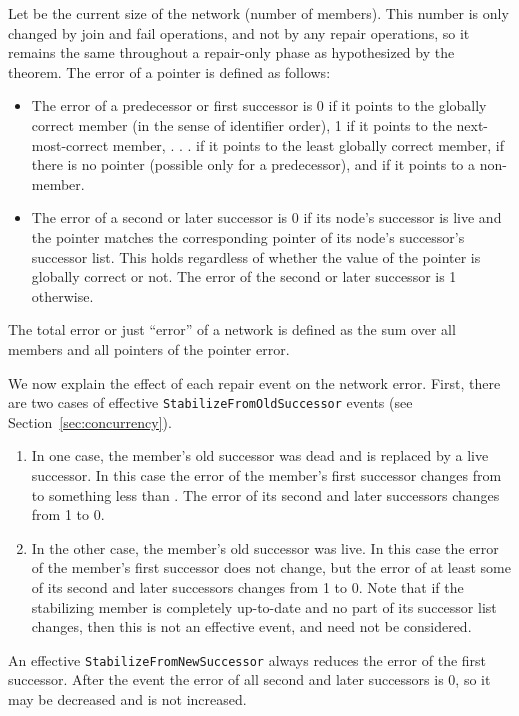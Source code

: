\documentclass[conference]{IEEEtran}
\begin{document}
Let  be the current size of the network (number of members).
This number is only changed by join and fail operations, and not by
any repair operations, so it remains the same throughout a repair-only
phase as hypothesized by the theorem.
The error of a pointer is defined as follows:
\begin{itemize}
\item
The error of a predecessor or first successor is 0 if it points to the
globally correct member (in the sense of identifier order), 1 if it
points to the next-most-correct member, . . .  if it points to
the least globally correct member, 
 if there is no pointer
(possible only for a predecessor), and
 if it points to a non-member.
\item
The error of a second or later successor is 0 if its node's successor
is live and the pointer
matches the corresponding pointer of its node's successor's
successor list.
This holds regardless of whether the value of the pointer is globally
correct or not.
The error of the second or later successor is 1 otherwise.
\end{itemize}
The total error or just ``error'' of a network
is defined as the sum over all members and
all pointers of the pointer error.

We now explain the effect of each repair event on the network error.
First, there are two cases of effective
\small
{\tt StabilizeFromOldSuccessor}
\normalsize
events (see Section~\ref{sec:concurrency}).
\begin{enumerate}
\item
In one case, the member's old successor was dead and is replaced by
a live successor.
In this case the error of the member's first successor changes from
 to something less than .
The error of its second and later successors changes from 1 to 0.
\item
In the other case, the member's old successor was live.
In this case the error of the member's first successor does not change,
but the error of at least some
of its second and later successors changes from 1 to 0.
Note that if the stabilizing member is completely up-to-date and
no part of its successor list changes, then this is not an effective
event, and need not be considered.
\end{enumerate}

An effective 
\small
{\tt StabilizeFromNewSuccessor}
\normalsize
always
reduces the error of the first successor.  
After the event the error of all second and later successors is 0,
so it may be decreased and is not increased.
\end{document}
